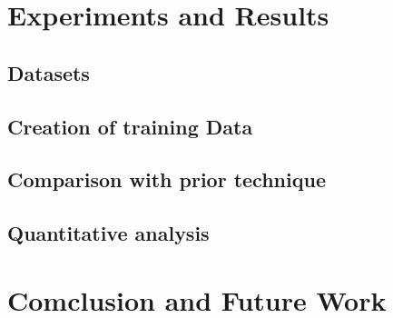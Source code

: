 \documentclass[times,10pt,twocolumn,a4paper]{article}
\begin{document}
\section{Experiments and Results}
\subsection{Datasets}
\subsection{Creation of training Data}
\subsection{Comparison with prior technique}
\subsection{Quantitative analysis}
\section{Comclusion and Future Work}



\end{document}
